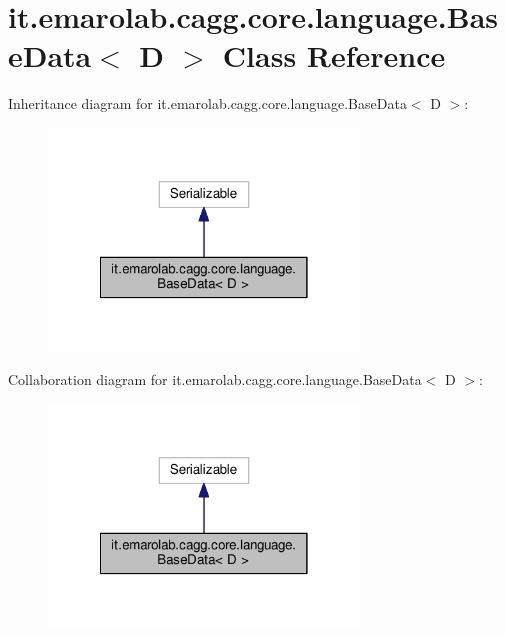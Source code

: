 \hypertarget{classit_1_1emarolab_1_1cagg_1_1core_1_1language_1_1BaseData_3_01D_01_4}{\section{it.\-emarolab.\-cagg.\-core.\-language.\-Base\-Data$<$ D $>$ Class Reference}
\label{classit_1_1emarolab_1_1cagg_1_1core_1_1language_1_1BaseData_3_01D_01_4}
}


Inheritance diagram for it.\-emarolab.\-cagg.\-core.\-language.\-Base\-Data$<$ D $>$\-:\nopagebreak
\begin{figure}[H]
\begin{center}
\leavevmode
\includegraphics[width=234pt]{classit_1_1emarolab_1_1cagg_1_1core_1_1language_1_1BaseData_3_01D_01_4__inherit__graph}
\end{center}
\end{figure}


Collaboration diagram for it.\-emarolab.\-cagg.\-core.\-language.\-Base\-Data$<$ D $>$\-:\nopagebreak
\begin{figure}[H]
\begin{center}
\leavevmode
\includegraphics[width=234pt]{classit_1_1emarolab_1_1cagg_1_1core_1_1language_1_1BaseData_3_01D_01_4__coll__graph}
\end{center}
\end{figure}
